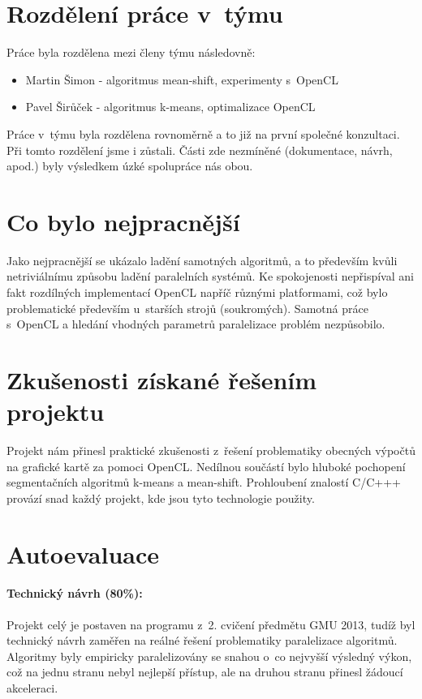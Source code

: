 \documentclass[11pt,a4paper]{article}
\begin{document}
\section{Rozdělení práce v~týmu}
Práce byla rozdělena mezi členy týmu následovně:
\begin{itemize}
\item Martin Šimon - algoritmus mean-shift, experimenty s~OpenCL
\item Pavel Širůček - algoritmus k-means, optimalizace OpenCL
\end{itemize}

Práce v~týmu byla rozdělena rovnoměrně a to již na první společné konzultaci. Při tomto rozdělení jsme i zůstali. Části zde nezmíněné (dokumentace, návrh, apod.) byly výsledkem úzké spolupráce nás obou.

\section{Co bylo nejpracnější}
Jako nejpracnější se ukázalo ladění samotných algoritmů, a to především kvůli netriviálnímu způsobu ladění paralelních systémů. Ke spokojenosti nepřispíval ani fakt rozdílných implementací OpenCL napříč různými platformami, což bylo problematické především u~starších strojů (soukromých). Samotná práce s~OpenCL a hledání vhodných parametrů paralelizace problém nezpůsobilo.

\section{Zkušenosti získané řešením projektu}
Projekt nám přinesl praktické zkušenosti z~řešení problematiky obecných výpočtů na grafické kartě za pomoci OpenCL. Nedílnou součástí bylo hluboké pochopení segmentačních algoritmů k-means a mean-shift. Prohloubení znalostí C/C+++ provází snad každý projekt, kde jsou tyto technologie použity.

\section{Autoevaluace}
\paragraph{Technický návrh (80\%):}
Projekt celý je postaven na programu z~2. cvičení předmětu GMU 2013, tudíž byl technický návrh zaměřen na reálné řešení problematiky paralelizace algoritmů. Algoritmy byly empiricky paralelizovány se snahou o~co nejvyšší výsledný výkon, což na jednu stranu nebyl nejlepší přístup, ale na druhou stranu přinesl žádoucí akceleraci.
\end{document}
